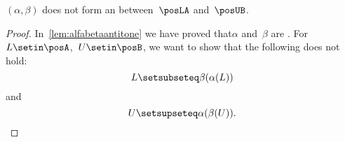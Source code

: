 {    %

    \begin{lemma}\label{lem:alpha-beta-not-antitone}
        $(\alpha, \beta)$ does not form an  between~$\posLA$ and~$\posUB$.
    \end{lemma}
    \begin{proof}
        In~\cref{lem:alfabetaantitone} we have proved that$\alpha$ and~$\beta$ are .
        For~$L\setin \posA$,~$U\setin \posB$, we want to show that the following does not hold:
        \begin{equation}
            \label{eq:alfabetafirst}
            L\setsubseteq \beta(\alpha(L))
        \end{equation}
        and
        \begin{equation}
            \label{eq:alfabetasec}
            U\setsupseteq \alpha(\beta(U)).
        \end{equation}


\end{proof}}

